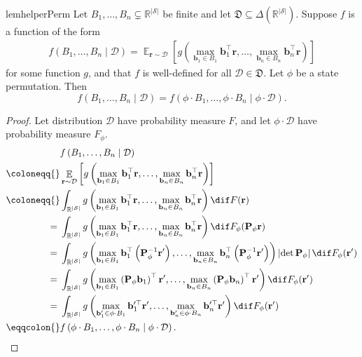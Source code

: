 \documentclass{article}
\renewcommand{\abs}[1]{\left|#1\right|}
\newcommand*{\prn}[1]{\left(#1\right)}
\newcommand*{\brx}[1]{\left[#1\right]}
\newcommand*{\defeq}{\coloneqq} %
\newcommand*{\eqdef}{\eqqcolon} %
\newcommand*{\bv}{\mathbf{b}}
\newcommand*{\reals}{\mathbb{R}}
\newcommand*{\permute}[1][\phi]{\mathbf{P}_{#1}} %
\newcommand*{\St}{\mathcal{S}}
\newcommand*{\rf}{\mathbf{r}} %
\newcommand*{\rewardVS}{\reals^{\abs{\St}}} %
\newcommand*{\D}{\mathcal{D}} %
\newcommand*{\distSet}{\mathfrak{D}}
\DeclareMathOperator*{\opE}{\mathbb{E}}
\newcommand*{\E}[2]{\opE_{#1}\brx{#2}} %
\newcommand*{\inv}{^{-1}}
\theoremstyle{definition}
\begin{document}
\begin{appendices}
\begin{restatable}{lem}{helperPerm}\label{lem:helper-perm}
Let $B_1,\ldots,B_n\subsetneq \rewardVS$ be finite and let $\distSet \subseteq \Delta(\rewardVS)$. Suppose $f$ is a function of the form
\begin{align}
    f\prn{B_1,\ldots,B_n \mid \D}=\E{\rf\sim \D}{g\prn{\max_{\bv_1\in B_1} \bv_1^\top \rf,\ldots, \max_{\bv_n\in B_n} \bv_n^\top \rf}}\label{eq:helper}
\end{align}
for some function $g$, and that $f$ is well-defined for all $\D \in \distSet$. Let $\phi$ be a state permutation. Then
\begin{equation}
    f\prn{B_1,\ldots,B_n \mid \D}=f\prn{\phi\cdot B_1 ,\ldots,\phi \cdot B_n \mid \phi \cdot\D}.
\end{equation}
\end{restatable}
\begin{proof} Let distribution $\D$ have probability measure $F$, and let $\phi\cdot \D$ have probability measure $F_\phi$. 
\begin{align}
    &f\prn{B_1,\ldots,B_n \mid \D}\\
    \defeq{}&\E{\rf\sim \D}{g\prn{\max_{\bv_1\in B_1} \bv_1^\top \rf,\ldots, \max_{\bv_n\in B_n} \bv_n^\top \rf}}\\
    \defeq{}&\int_{\rewardVS} g\prn{\max_{\bv_1\in B_1} \bv_1^\top \rf,\ldots, \max_{\bv_n\in B_n} \bv_n^\top \rf} \dF[\rf][F]\\
    ={}&\int_{\rewardVS} g\prn{\max_{\bv_1\in B_1} \bv_1^\top \rf,\ldots, \max_{\bv_n\in B_n} \bv_n^\top \rf} \dF[\permute\rf][F_\phi]\label{eq:permute-prob-meas}\\
    ={}&\int_{\rewardVS} g\prn{\max_{\bv_1\in B_1} \bv_1^\top \prn{\permute\inv\rf'},\ldots, \max_{\bv_n\in B_n} \bv_n^\top \prn{\permute\inv\rf'}} \abs{\det \permute}\dF[\rf'][F_\phi]\label{eq:change-of-variables}\\
    ={}&\int_{\rewardVS} g\prn{\max_{\bv_1\in B_1} \prn{\permute\bv_1}^\top \rf',\ldots, \max_{\bv_n\in B_n} \prn{\permute\bv_n}^\top \rf'} \dF[\rf'][F_\phi]\label{eq:change-of-variables-2}\\
    ={}&\int_{\rewardVS} g\prn{\max_{\bv_1'\in \phi\cdot B_1} \bv_1'^{\top} \rf',\ldots, \max_{\bv_n'\in \phi\cdot B_n} \bv_n'^{\top} \rf'} \dF[\rf'][F_\phi]\\
    \eqdef{}& f\prn{\phi \cdot B_1,\ldots,\phi\cdot B_n \mid \phi\cdot \D}.
\end{align}


\end{proof}
\end{appendices}
\end{document}
